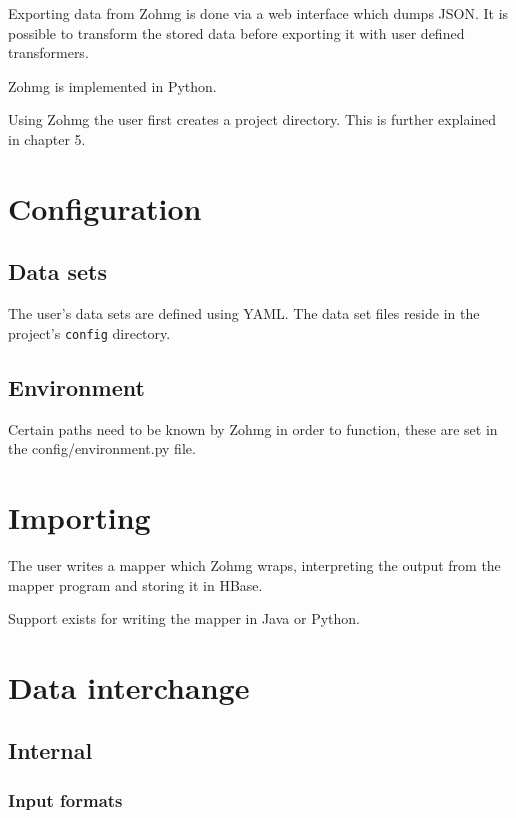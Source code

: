 \documentclass[a4paper,10pt]{book}
\begin{document}
Exporting data from Zohmg is done via a web interface which dumps JSON.
It is possible to transform the stored data before exporting it with user
defined transformers.

Zohmg is implemented in Python.

Using Zohmg the user first creates a project directory. This is further
explained in chapter 5.


\section{Configuration}

\subsection{Data sets}

The user's data sets are defined using YAML. The data set files reside in
the project's \texttt{config} directory.


\subsection{Environment}

Certain paths need to be known by Zohmg in order to function, these are set
in the config/environment.py file.



\section{Importing}

The user writes a mapper which Zohmg wraps, interpreting the output from
the mapper program and storing it in HBase.

Support exists for writing the mapper in Java or Python.



\section{Data interchange}

\subsection{Internal}

\subsubsection{Input formats}
\end{document}
